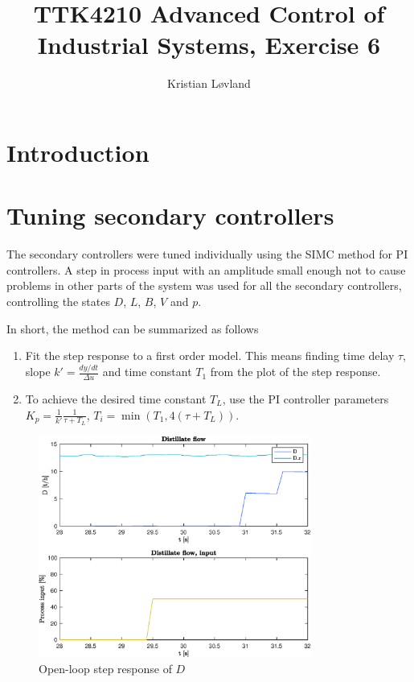 \documentclass[12pt]{article}
\title{TTK4210 Advanced Control of Industrial Systems, Exercise 6}
\date{}
\author{Kristian Løvland}
\begin{document}
\maketitle

\section{Introduction}

\newpage
\section{Tuning secondary controllers}
The secondary controllers were tuned individually using the SIMC method for PI controllers. A step in process input with an amplitude small enough not to cause problems in other parts of the system was used for all the secondary controllers, controlling the states $D$, $L$, $B$, $V$ and $p$.

In short, the method can be summarized as follows 

\begin{enumerate}
\item Fit the step response to a first order model. This means finding time delay $\tau$, slope $k' = \frac{dy/dt}{\Delta u}$ and time constant $T_1$ from the plot of the step response.
\item To achieve the desired time constant $T_L$, use the PI controller parameters $K_p = \frac{1}{k'} \frac{1}{\tau + T_L}$, $T_i = \min(T_1, 4(\tau + T_L))$.
\end{enumerate}

\begin{figure}
\centering
\includegraphics[width=0.8\textwidth]{../Systemanalyse/Log_Data_to_Matlab/Figurer/Stegeksperimenter/FC1005.eps}
\caption{Open-loop step response of $D$}
\label{fig:ol_step_FC1005}
\end{figure}
\end{document}
